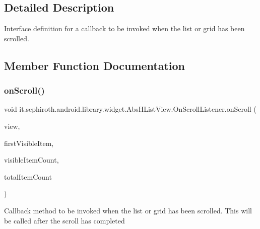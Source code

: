\subsection{Detailed Description}
Interface definition for a callback to be invoked when the list or grid has been scrolled. 

\subsection{Member Function Documentation}
\mbox{\label{interfaceit_1_1sephiroth_1_1android_1_1library_1_1widget_1_1_abs_h_list_view_1_1_on_scroll_listener_a723da32580a9e0e6f98f7c2826850ee5}} 
\subsubsection{\texorpdfstring{on\+Scroll()}{onScroll()}}
{\footnotesize\ttfamily void it.\+sephiroth.\+android.\+library.\+widget.\+Abs\+H\+List\+View.\+On\+Scroll\+Listener.\+on\+Scroll (\begin{DoxyParamCaption}\item[{\hyperlink{classit_1_1sephiroth_1_1android_1_1library_1_1widget_1_1_abs_h_list_view}{Abs\+H\+List\+View}}]{view,  }\item[{int}]{first\+Visible\+Item,  }\item[{int}]{visible\+Item\+Count,  }\item[{int}]{total\+Item\+Count }\end{DoxyParamCaption})}

Callback method to be invoked when the list or grid has been scrolled. This will be called after the scroll has completed


